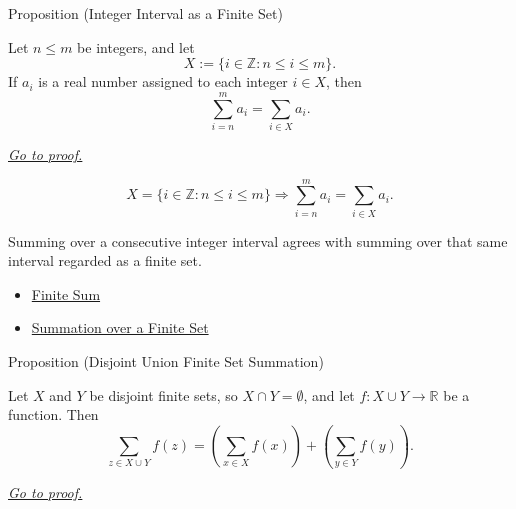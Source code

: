 \begin{propositionbox}{Proposition (Integer Interval as a Finite Set)}
\begin{proposition}
\label{prop:integer-interval-finite-set-summation}

Let \(n \le m\) be integers, and let
\[
  X:=\{i\in\mathbb{Z}:n\le i\le m\}.
\]
If \(a_i\) is a real number assigned to each integer \(i\in X\), then
\[
  \sum_{i=n}^{m} a_i
  =
  \sum_{i\in X} a_i.
\]

\smallskip
\noindent
\hyperref[prf:integer-interval-finite-set-summation]{\textit{Go to proof.}}
\end{proposition}
\end{propositionbox}

\begin{remark*}
\[
  X=\{i\in\mathbb Z:n\le i\le m\}
  \Longrightarrow
  \sum_{i=n}^{m}a_i=\sum_{i\in X}a_i.
\]
\end{remark*}

\begin{remark*}[Interpretation]
Summing over a consecutive integer interval agrees with summing over that
same interval regarded as a finite set.
\end{remark*}

\begin{dependencies}
\begin{itemize}
  \item \hyperref[def:finite-sum]{Finite Sum}
  \item \hyperref[def:summation-over-finite-set]{Summation over a Finite Set}
\end{itemize}
\end{dependencies}

\begin{propositionbox}{Proposition (Disjoint Union Finite Set Summation)}
\begin{proposition}
\label{prop:disjoint-union-finite-set-summation}

Let \(X\) and \(Y\) be disjoint finite sets, so \(X\cap Y=\emptyset\),
and let \(f:X\cup Y\to\mathbb{R}\) be a function. Then
\[
  \sum_{z\in X\cup Y} f(z)
  =
  \left(\sum_{x\in X} f(x)\right)
  +
  \left(\sum_{y\in Y} f(y)\right).
\]

\smallskip
\noindent
\hyperref[prf:disjoint-union-finite-set-summation]{\textit{Go to proof.}}
\end{proposition}
\end{propositionbox}

